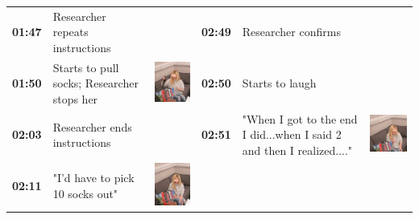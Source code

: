 \documentclass[twocolumn, serif, empirical, authordate]{jote-article}
\begin{document}
\begin{table}[ht!]
\begin{mdframed}[linecolor=jotedark]
\begin{tabularx}{\linewidth}{@{} p{.05\linewidth} p{.28\linewidth} >{\raggedleft\arraybackslash}p{.1\linewidth}  p{.05\linewidth} p{.28\linewidth} >{\raggedleft\arraybackslash}p{.1\linewidth} @{}}
\textbf{01:47} & Researcher repeats instructions &  &
 \textbf{02:49} & Researcher confirms & \\
 
\textbf{01:50} & Starts to pull socks; Researcher stops her & \includegraphics[height=.09\textheight, valign=t]{media/image20.png} &
 \textbf{02:50} & Starts to laugh & \\ 
 
 \textbf{02:03} & Researcher ends instructions & &
 \textbf{02:51} & "When I got to the end I did...when I said 2 and then I realized...." & \includegraphics[height=.09\textheight, valign=t]{media/image28.png} \\ 
 
 \textbf{02:11} & "I'd have to pick 10 socks out" & \includegraphics[height=.09\textheight, valign=t]{media/image21.png} & & &\\
\end{tabularx}
\vskip4pt
\end{mdframed}
\end{table}
\end{document}
